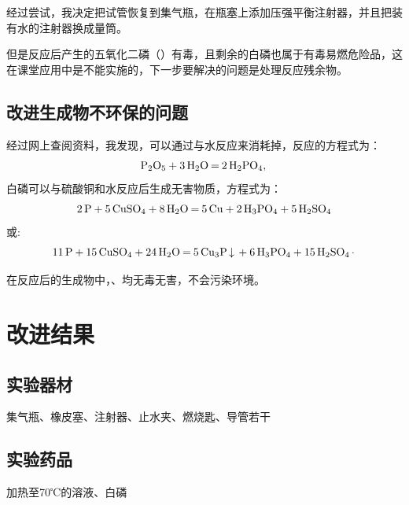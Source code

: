 \documentclass[11pt,a4paper,titlepage]{ctexart}
\begin{document}
	经过尝试，我决定把试管恢复到集气瓶，在瓶塞上添加压强平衡注射器，并且把装有水的注射器换成量筒。
	
	但是反应后产生的五氧化二磷（）有毒，且剩余的白磷也属于有毒易燃危险品，这在课堂应用中是不能实施的，下一步要解决的问题是处理反应残余物。
	
	\subsection{改进生成物不环保的问题}
	
	经过网上查阅资料，我发现，可以通过与水反应来消耗掉，反应的方程式为：
	\[\ce{P2O5 + 3H2O = 2H2PO4,}\]
	白磷可以与硫酸铜和水反应后生成无害物质，方程式为：
	\[\ce{2P + 5CuSO4 + 8H2O = 5Cu + 2H3PO4 + 5H2SO4}\]
	或:\[\ce{11P + 15CuSO4 + 24H2O = 5Cu3P v + 6H3PO4 + 15H2SO4.}\]
	
	在反应后的生成物中，、均无毒无害，不会污染环境。
	
	\section{改进结果}
	\subsection{实验器材}
	
	集气瓶、橡皮塞、注射器、止水夹、燃烧匙、导管若干
	
	\subsection{实验药品}
	
	加热至70℃的溶液、白磷
\end{document}
